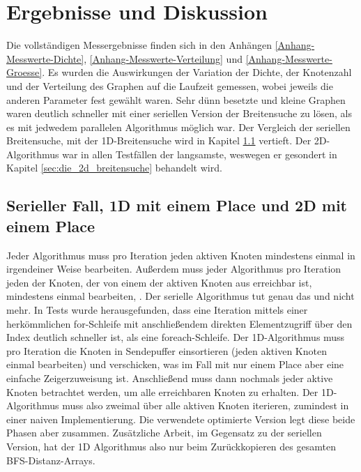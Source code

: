 \chapter{Ergebnisse und Diskussion} %
\label{cha:ergebnisse_und_diskussion}

Die vollständigen Messergebnisse finden sich in den Anhängen \ref{Anhang-Messwerte-Dichte}, \ref{Anhang-Messwerte-Verteilung} und \ref{Anhang-Messwerte-Groesse}. Es wurden die Auswirkungen der Variation der Dichte, der Knotenzahl und der Verteilung des Graphen auf die Laufzeit gemessen, wobei jeweils die anderen Parameter fest gewählt waren. Sehr dünn besetzte und kleine Graphen waren deutlich schneller mit einer seriellen Version der Breitensuche zu lösen, als es mit jedwedem parallelen Algorithmus möglich war. Der Vergleich der seriellen Breitensuche, mit der 1D-Breitensuche wird in Kapitel \ref{sec:serieller_fall_vs_1d_mit_einem_place} vertieft. Der 2D-Algorithmus war in allen Testfällen der langsamste, weswegen er gesondert in Kapitel \ref{sec:die_2d_breitensuche} behandelt wird.

\section{Serieller Fall, 1D mit einem Place und 2D mit einem Place} %
\label{sec:serieller_fall_vs_1d_mit_einem_place}
Jeder Algorithmus muss pro Iteration jeden aktiven Knoten mindestens einmal in irgendeiner Weise bearbeiten. Außerdem muss jeder Algorithmus pro Iteration jeden der Knoten, der von einem der aktiven Knoten aus erreichbar ist, mindestens einmal bearbeiten, . Der serielle Algorithmus tut genau das und nicht mehr. In Tests wurde herausgefunden, dass eine Iteration mittels einer herkömmlichen for-Schleife mit anschließendem direkten Elementzugriff über den Index deutlich schneller ist, als eine foreach-Schleife. Der 1D-Algorithmus muss pro Iteration die Knoten in Sendepuffer einsortieren (jeden aktiven Knoten einmal bearbeiten) und verschicken, was im Fall mit nur einem Place aber eine einfache Zeigerzuweisung ist. Anschließend muss dann nochmals jeder aktive Knoten betrachtet werden, um alle erreichbaren Knoten zu erhalten. Der 1D-Algorithmus muss also zweimal über alle aktiven Knoten iterieren, zumindest in einer naiven Implementierung. Die verwendete optimierte Version legt diese beide Phasen aber zusammen. Zusätzliche Arbeit, im Gegensatz zu der seriellen Version, hat der 1D Algorithmus also nur beim Zurückkopieren des gesamten BFS-Distanz-Arrays.

